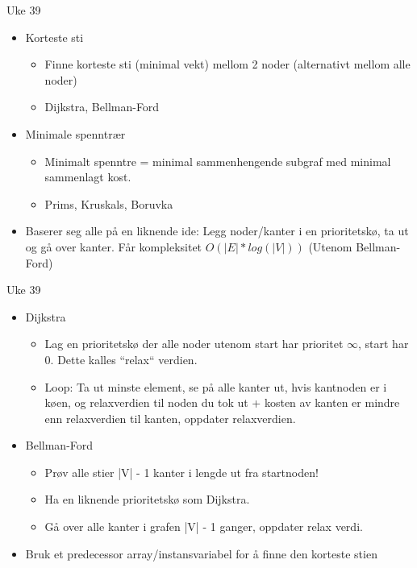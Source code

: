 \documentclass[norsk]{beamer}
\begin{document}
	\begin{frame}{Uke 39}
		\begin{itemize}
			\item Korteste sti
				\begin{itemize}
					\item Finne korteste sti (minimal vekt) mellom 2 noder (alternativt mellom alle
						noder)
					\item Dijkstra, Bellman-Ford
				\end{itemize}
			\item Minimale spenntrær
				\begin{itemize}
					\item Minimalt spenntre = minimal sammenhengende subgraf med minimal
						sammenlagt kost.
					\item Prims, Kruskals, Boruvka
				\end{itemize}
			\item Baserer seg alle på en liknende ide: Legg noder/kanter i en
				prioritetskø, ta ut og gå over kanter. Får
				kompleksitet $O(|E|*log(|V|))$ (Utenom Bellman-Ford)
		\end{itemize}
	\end{frame}

	\begin{frame}{Uke 39}
		\begin{itemize}
			\item Dijkstra
				\begin{itemize}
					\item Lag en prioritetskø der alle noder utenom start har prioritet
						$\infty$, start har 0. Dette kalles ``relax`` verdien.
					\item Loop: Ta ut minste element, se på alle kanter ut, hvis
						kantnoden er i køen, og relaxverdien til noden du tok ut + kosten
						av kanten er mindre enn relaxverdien til kanten, oppdater
						relaxverdien.
				\end{itemize}
			\item Bellman-Ford
				\begin{itemize}
					\item Prøv alle stier |V| - 1 kanter i lengde ut fra startnoden!
					\item Ha en liknende prioritetskø som Dijkstra.
					\item Gå over alle kanter i grafen |V| - 1 ganger, oppdater relax verdi.

				\end{itemize}
			\item Bruk et predecessor array/instansvariabel for å finne den
				korteste stien
		\end{itemize}
	\end{frame}
\end{document}
